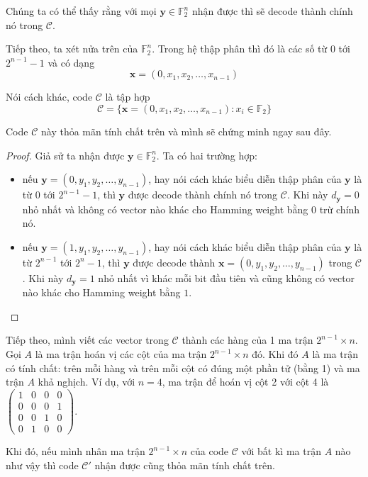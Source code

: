 Chúng ta có thể thấy rằng với mọi $\bm{y} \in \mathbb{F}_2^n$ nhận được thì sẽ decode thành chính nó trong $\mathcal{C}$.

Tiếp theo, ta xét nửa trên của $\mathbb{F}_2^n$. Trong hệ thập phân thì đó là các số từ $0$ tới $2^{n-1} - 1$ và có dạng \[ \bm{x} = (0, x_1, x_2, \ldots, x_{n-1}) \]

Nói cách khác, code $\mathcal{C}$ là tập hợp \[ \mathcal{C} = \{ \bm{x} = (0, x_1, x_2, \ldots, x_{n-1}): x_i \in \mathbb{F}_2 \} \]

Code $\mathcal{C}$ này thỏa mãn tính chất trên và mình sẽ chứng minh ngay sau đây.

\begin{proof}
    Giả sử ta nhận được $\bm{y} \in \mathbb{F}_2^n$. Ta có hai trường hợp:
    \begin{itemize}
        \item nếu $\bm{y} = (0, y_1, y_2, \ldots, y_{n-1})$, hay nói cách khác biểu diễn thập phân của $\bm{y}$ là từ $0$ tới $2^{n-1} - 1$, thì $\bm{y}$ được decode thành chính nó trong $\mathcal{C}$. Khi này $d_{\bm{y}} = 0$ nhỏ nhất và không có vector nào khác cho Hamming weight bằng $0$ trừ chính nó.
        \item nếu $\bm{y} = (1, y_1, y_2, \ldots, y_{n-1})$, hay nói cách khác biểu diễn thập phân của $\bm{y}$ là từ $2^{n-1}$ tới $2^n - 1$, thì $\bm{y}$ được decode thành $\bm{x} = (0, y_1, y_2, \ldots, y_{n-1})$ trong $\mathcal{C}$. Khi này $d_{\bm{y}} = 1$ nhỏ nhất vì khác mỗi bit đầu tiên và cũng không có vector nào khác cho Hamming weight bằng $1$.
    \end{itemize}
\end{proof}

Tiếp theo, mình viết các vector trong $\mathcal{C}$ thành các hàng của 1 ma trận $2^{n-1} \times n$. Gọi $A$ là ma trận hoán vị các cột của ma trận $2^{n-1} \times n$ đó. Khi đó $A$ là ma trận có tính chất: trên mỗi hàng và trên mỗi cột có đúng một phần tử (bằng 1) và ma trận $A$ khả nghịch. Ví dụ, với $n=4$, ma trận để hoán vị cột 2 với cột 4 là $\begin{pmatrix}1 & 0 & 0 & 0 \\ 0 & 0 & 0 & 1 \\ 0 & 0 & 1 & 0 \\ 0 & 1 & 0 & 0 \end{pmatrix}$.

Khi đó, nếu mình nhân ma trận $2^{n-1} \times n$ của code $\mathcal{C}$ với bất kì ma trận $A$ nào như vậy thì code $\mathcal{C}'$ nhận được cũng thỏa mãn tính chất trên.


